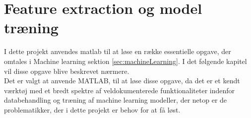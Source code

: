 \thispagestyle{fancy}
\chapter{Feature extraction og model træning}
\label{chp:matlabChapter}
I dette projekt anvendes matlab til at løse en række essentielle opgave, der omtales i Machine learning sektion \ref{sec:machineLearning}. I det følgende kapitel vil disse opgave blive beskrevet nærmere. \\
Det er valgt at anvende MATLAB, til at løse disse opgave, da det er et kendt værktøj med et bredt spektre af veldokumenterede funktionaliteter indenfor databehandling\citep{matlabFeatures} og træning af machine learning modeller\citep{matlabML}, der netop er de problematikker, der i dette projekt er behov for at få løst.  

